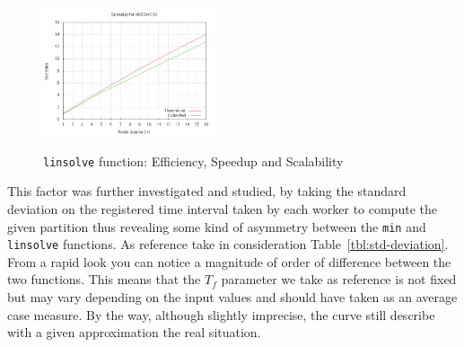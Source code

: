 \begin{figure}[!h]
{    \includegraphics[width=0.45\textwidth]{plots/linsolve/speed-4000.png}
  }\\
  \caption{\texttt{linsolve} function: Efficiency, Speedup and Scalability}
  \label{fig:linsolve-scal-eff}
\end{figure}

This factor was further investigated and studied, by taking the standard
deviation on the registered time interval taken by each worker to
compute the given partition thus revealing some kind of asymmetry
between the \texttt{min} and \texttt{linsolve} functions. As reference
take in consideration Table~\ref{tbl:std-deviation}. From a rapid look
you can notice a magnitude of order of difference between the two
functions. This means that the $T_f$ parameter we take as reference
is not fixed but may vary depending on the input values and should have
taken as an average case measure. By the way, although slightly imprecise,
the curve still describe with a given approximation the real situation.

